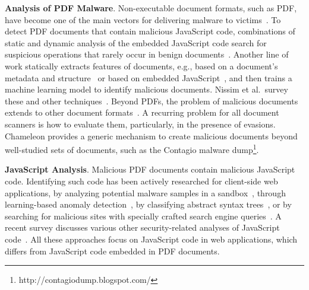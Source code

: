 \textbf{Analysis of PDF Malware}.
Non-executable document formats, such as PDF, have become one of the main vectors for delivering malware to victims~\cite{hardy2014targeted}.
To detect PDF documents that contain malicious JavaScript code, combinations of static and dynamic analysis of the embedded JavaScript code search for suspicious operations that rarely occur in benign documents~\cite{liu2014detecting,schmitt2012pdf,tzermias2011combining,lu2013obfuscation}.
Another line of work statically extracts features of documents, e.g., based on a document's metadata and structure~\cite{smutz2012malicious,maiorca2012pattern,vsrndic2013detection} or based on embedded JavaScript~\cite{laskov2011static,corona2014lux0r}, and then trains a machine learning model to identify malicious documents.
Nissim et al.\ survey these and other techniques~\cite{nissim2015detection}.
Beyond PDFs, the problem of malicious documents extends to other document formats~\cite{nissim2017aldocx}. 
A recurring problem for all document scanners is how to evaluate them, particularly, in the presence of evasions.
Chameleon provides a generic mechanism to create malicious documents beyond well-studied sets of documents, such as the Contagio malware dump\footnote{http://contagiodump.blogspot.com/}.


\textbf{JavaScript Analysis}.
Malicious PDF documents contain malicious JavaScript code.
Identifying such code has been actively researched for client-side web applications, by analyzing potential malware samples in a sandbox~\cite{willems2007toward}, through learning-based anomaly detection~\cite{cova2010detection}, by classifying abstract syntax trees~\cite{curtsinger2011zozzle}, or by searching for malicious sites with specially crafted search engine queries~\cite{invernizzi2012evilseed}.
A recent survey discusses various other security-related analyses of JavaScript code~\cite{jsSurvey2017}.
All these approaches focus on JavaScript code in web applications, which differs from JavaScript code embedded in PDF documents.


